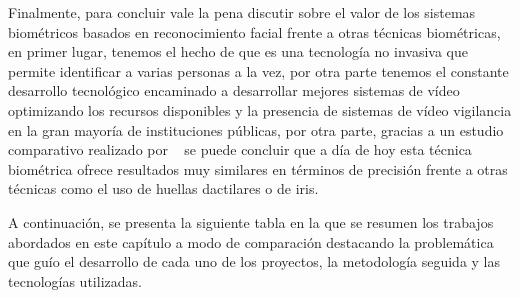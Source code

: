 Finalmente, para concluir vale la pena discutir sobre el valor de los sistemas biométricos basados en reconocimiento facial frente a otras técnicas biométricas, en primer lugar, tenemos el hecho de que es una tecnología no invasiva que permite identificar a varias personas a la vez, por otra parte tenemos el constante desarrollo tecnológico encaminado a desarrollar mejores sistemas de vídeo optimizando los recursos disponibles y la presencia de sistemas de vídeo vigilancia en la gran mayoría de instituciones públicas, por otra parte, gracias a un estudio comparativo realizado por ~\cite{FacialF} se puede concluir que a día de hoy esta técnica biométrica ofrece resultados muy similares en términos de precisión frente a otras técnicas como el uso de huellas dactilares o de iris.

A continuación, se presenta la siguiente tabla en la que se resumen los trabajos abordados en este capítulo a modo de comparación destacando la problemática que guío el desarrollo de cada uno de los proyectos, la metodología seguida y las tecnologías utilizadas.



